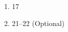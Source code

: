 \documentclass[12pt]{article}
\begin{document}
\begin{enumerate}
\setlength{\itemsep}{-1mm}
  \item 17
  \item 21--22 (Optional)
\end{enumerate}


\end{document}
